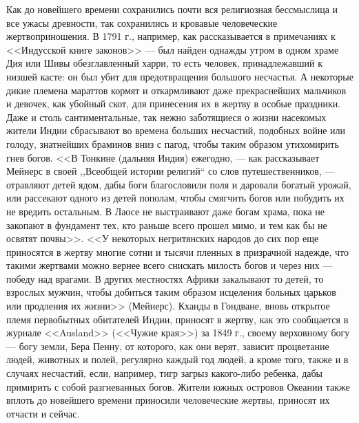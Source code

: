 \documentclass[12pt]{article}
\begin{document}
Как до новейшего времени сохранились почти вся религиозная бессмыслица и все ужасы древности, так сохранились и кровавые человеческие жертвоприношения. В 1791 г., например, как рассказывается в примечаниях к <<Индусской книге законов>>  --- был найден однажды утром в одном храме Дия или Шивы обезглавленный харри, то есть человек, принадлежавший к низшей касте: он был убит для предотвращения большого несчастья. А некоторые дикие племена мараттов кормят и откармливают даже прекраснейших мальчиков и девочек, как убойный скот, для принесения их в жертву в особые праздники. Даже и столь сантиментальные, так нежно заботящиеся о жизни насекомых жители Индии сбрасывают во времена больших несчастий, подобных войне или голоду, знатнейших браминов вниз с пагод, чтобы таким образом утихомирить гнев богов. <<В Тонкине (дальняя Индия) ежегодно, ---  как рассказывает Мейнерс в своей ,,Всеобщей истории религий`` со слов путешественников, --- отравляют детей ядом, дабы боги благословили поля и даровали богатый урожай, или рассекают одного из детей пополам, чтобы смягчить богов или побудить их не вредить остальным. В Лаосе не выстраивают даже богам храма, пока не закопают в фундамент тех, кто раньше всего прошел мимо, и тем как бы не освятят почвы>>. <<У некоторых негритянских народов до сих пор еще приносятся в жертву многие сотни и тысячи пленных в призрачной надежде, что такими жертвами можно вернее всего снискать милость богов и через них --- победу над врагами. В других местностях Африки закалывают то детей, то взрослых мужчин, чтобы добиться таким образом исцеления больных царьков или продления их жизни>> (Мейнерс). Кханды в Гондване, вновь открытое племя первобытных обитателей Индии, приносят в жертву, как это сообщается в журнале <<Ausland>> (<<Чужие края>>) за 1849 г., своему верховному богу --- богу земли, Бера Пенну, от которого, как они верят, зависит процветание людей, животных и полей, регулярно каждый год людей, а кроме того, также и в случаях несчастий, если, например, тигр загрыз какого-либо ребенка, дабы примирить с собой разгневанных богов. Жители южных островов Океании также вплоть до новейшего времени приносили человеческие жертвы, приносят их отчасти и сейчас. 
\end{document}
